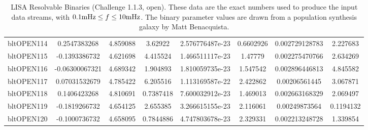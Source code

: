 \documentclass[11pt]{report}
\begin{document}
\begin{sidewaystable}
{\begin{tabular}{|l|c|c|c|c|c|c|c|}
bltOPEN114   & 0.2547383268   &     4.859088   &      3.62922   & 2.576776487e-23   &    0.6602926   & 0.002729128783   &     2.227683\\
bltOPEN115   & -0.1393386732   &     4.621698   &     4.415524   & 1.466511117e-23   &      1.47779   & 0.002275470766   &     2.634269\\
bltOPEN116   & -0.06300067321   &     4.689342   &     1.904893   & 1.810059735e-23   &     1.547542   & 0.002896446813   &     4.845582\\
bltOPEN117   & 0.07031532679   &     4.785422   &     6.205516   & 1.113169587e-22   &     2.422862   & 0.00206561445   &     3.067871\\
bltOPEN118   & 0.1406423268   &     4.810691   &    0.7387418   & 7.600032912e-23   &     1.469013   & 0.002663168329   &     2.069497\\
bltOPEN119   & -0.1819266732   &     4.654125   &     2.655385   & 3.266615155e-23   &     2.116061   & 0.00249873564   &    0.1194132\\
bltOPEN120   & -0.1000736732   &     4.658095   &    0.7844886   & 4.747803678e-23   &     2.329331   & 0.002213248728   &     1.339854\\
\hline
\end{tabular}
\label{tbl.LISAbinaries1.1.3}
    \caption{LISA Resolvable Binaries (Challenge 1.1.3, open).  These data are the exact numbers
    used to produce the input data streams, with $0.1  {\rm mHz} \leq f \leq 10 {\rm mHz}$.
    The binary parameter values are drawn from a
    population synthesis galaxy by Matt Benacquista.}
}
\end{sidewaystable}
\end{document}

